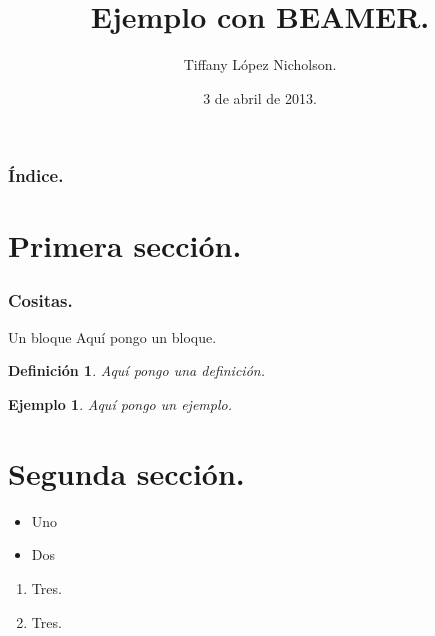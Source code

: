 \documentclass{beamer}
\title[Ejemplo]{Ejemplo con BEAMER.}
\author[Nombre]{Tiffany López Nicholson.}
\date[Fecha]{3 de abril de 2013.}
\newtheorem{definicion}{Definición}
\newtheorem{ejemplo}{Ejemplo}
\begin{document}
  \begin{frame}
    \titlepage
  \end{frame}
  \begin{frame}
    \frametitle{Índice.}
    \tableofcontents[pausesections]
  \end{frame}

  \section{Primera sección.}

    \begin{frame}
      \frametitle{Cositas.}
      \begin{block}{Un bloque}
	Aquí pongo un bloque.
      \end{block}

      \begin{definicion}
	Aquí pongo una definición.
      \end{definicion}

      \begin{ejemplo}
	Aquí pongo un ejemplo.
      \end{ejemplo}
    \end{frame}

  \section{Segunda sección.}

    \begin{frame}
      \begin{itemize}
	\item 
	Uno
	\pause

	\item 
	Dos
	\pause
      \end{itemize}

      \begin{enumerate}
	\item 
	Tres.
	\pause

	\item 
	Tres.
	\pause
      \end{enumerate}

    \end{frame}
\end{document}
